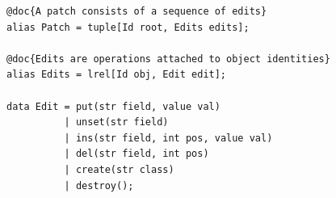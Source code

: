 
\begin{lstlisting}[label=lst:delta-adt, caption={CRUD-like patch definition in Rascal.}, language=Rascal, float=tb, numbers=none, xleftmargin=.1\columnwidth, xrightmargin=.1\columnwidth, aboveskip=0pt, belowskip=0pt]
@doc{A patch consists of a sequence of edits}
alias Patch = tuple[Id root, Edits edits];

@doc{Edits are operations attached to object identities}
alias Edits = lrel[Id obj, Edit edit];

data Edit = put(str field, value val)
          | unset(str field)
          | ins(str field, int pos, value val)
          | del(str field, int pos)
          | create(str class) 
          | destroy();
\end{lstlisting}
